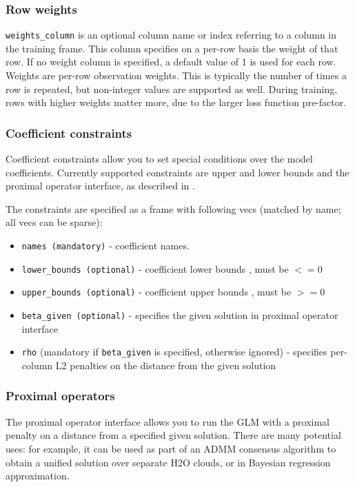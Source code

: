 \subsubsection{Row weights}

\texttt{weights\_column} is an optional column name or index referring to a column in the training frame. This column specifies on a per-row basis the weight of that row.  If no weight column is specified, a default value of 1 is used for each row. Weights are per-row observation weights. This is typically the number of times a row is repeated, but non-integer values are supported as well. During training, rows with higher weights matter more, due to the larger loss function pre-factor.

\subsubsection{Coefficient constraints}

Coefficient constraints allow you to set special conditions over the model coefficients. Currently supported
constraints are upper and lower bounds and the proximal operator interface, as described in .

The constraints are specified as a frame with following vecs (matched by name; all vecs can be sparse):

\begin{itemize}
\item \texttt{names (mandatory)}  - coefficient names. 
\item \texttt{lower\_bounds (optional)} - coefficient lower bounds , must be $<= 0$
\item \texttt{upper\_bounds (optional)} - coefficient upper bounds , must be $>= 0$
\item \texttt{beta\_given (optional)} - specifies the given solution in proximal operator interface
\item \texttt{rho} (mandatory if \texttt{beta\_given} is specified, otherwise ignored) - specifies per-column L2 penalties on the distance from the given solution
\end{itemize}
 
\subsubsection{Proximal operators}

The proximal operator interface allows you to run the GLM with a proximal penalty on a distance from a specified
given solution. There are many potential uses: for example, it can be used as part of an ADMM consensus algorithm
to obtain a unified solution over separate H2O clouds, or in Bayesian regression approximation.

